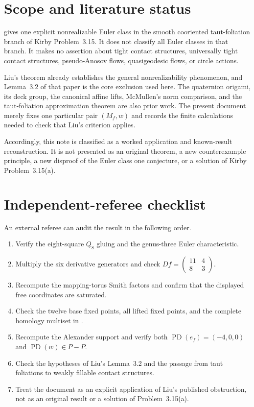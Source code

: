\documentclass[10pt,reqno]{amsart}
\theoremstyle{definition}
\newcommand{\PD}{\operatorname{PD}}
\begin{document}
\section{Scope and literature status}

 gives one explicit nonrealizable Euler class in the smooth
cooriented taut-foliation branch of Kirby Problem~3.15.  It does not classify
all Euler classes in that branch.  It makes no assertion about tight contact
structures, universally tight contact structures, pseudo-Anosov flows,
quasigeodesic flows, or circle actions.

Liu's theorem already establishes the general nonrealizability phenomenon,
and Lemma~3.2 of that paper is the core exclusion used here.  The quaternion
origami, its deck group, the canonical affine lifts, McMullen's norm
comparison, and the taut-foliation approximation theorem are also prior work.
The present document merely fixes one particular pair \((M_f,w)\) and records
the finite calculations needed to check that Liu's criterion applies.

Accordingly, this note is classified as a worked application and known-result
reconstruction.  It is not presented as an original theorem, a new
counterexample principle, a new disproof of the Euler class one conjecture, or
a solution of Kirby Problem~3.15(a).

\section{Independent-referee checklist}

An external referee can audit the result in the following order.

\begin{enumerate}
\item Verify the eight-square \(Q_8\) gluing and the genus-three Euler
  characteristic.
\item Multiply the six derivative generators and check
  \(Df=\left(\begin{smallmatrix}11&4\\8&3\end{smallmatrix}\right)\).
\item Recompute the mapping-torus Smith factors and confirm that the displayed
  free coordinates are saturated.
\item Check the twelve base fixed points, all lifted fixed points, and the
  complete homology multiset in .
\item Recompute the Alexander support and verify both
  \(\PD(e_f)=(-4,0,0)\) and \(\PD(w)\in P-P\).
\item Check the hypotheses of Liu's Lemma~3.2 and the passage from taut
  foliations to weakly fillable contact structures.
\item Treat the document as an explicit application of Liu's published
  obstruction, not as an original result or a solution of Problem~3.15(a).
\end{enumerate}
\end{document}
